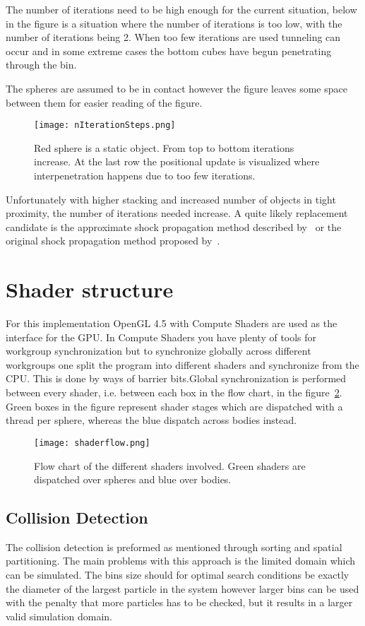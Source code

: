 The number of iterations need to be high enough for the current situation, below
in the figure is a situation where the number of iterations is too low, with the
number of iterations being 2. When too few iterations are used tunneling can occur
and in some extreme cases the bottom cubes have begun penetrating through the bin.

The spheres are assumed to be in contact however
the figure leaves some space between them for easier reading of the figure.

\begin{figure}[H]
  \centering
  \texttt{[image: nIterationSteps.png]}
  \caption{Red sphere is a static object. From top to bottom iterations increase. At the last row the positional update is visualized where interpenetration happens due to too few iterations.}
  \label{fig:flow}
\end{figure}

Unfortunately with higher stacking and increased number of objects in tight proximity,
the number of iterations needed increase. A quite likely replacement candidate is
the approximate shock propagation method described by~\cite{flex} or the original
shock propagation method proposed by~\cite{guendelman}.

\section{Shader structure}
For this implementation OpenGL 4.5 with Compute Shaders are used as the interface
for the GPU. In Compute Shaders you have plenty of tools for workgroup synchronization
but to synchronize globally across different workgroups one split the program into
different shaders and synchronize from the CPU. This is done by ways of barrier bits.Global synchronization
is performed between every shader, i.e. between each box in the flow chart, in the figure~\ref{fig:flow}. Green
boxes in the figure represent shader stages which are dispatched with a thread per
sphere, whereas the blue dispatch across bodies instead.

\begin{figure}[H]
  \centering
  \texttt{[image: shaderflow.png]}
  \caption{Flow chart of the different shaders involved. Green shaders are dispatched over spheres and blue over bodies.}
  \label{fig:flow}
\end{figure}


\subsection{Collision Detection}
The collision detection is preformed as mentioned through sorting and spatial partitioning.
The main problems with this approach is the limited domain which can be simulated.
The bins size should for optimal search conditions be exactly the diameter of the largest
particle in the system however larger bins can be used with the penalty that more
particles has to be checked, but it results in a larger valid simulation domain.

